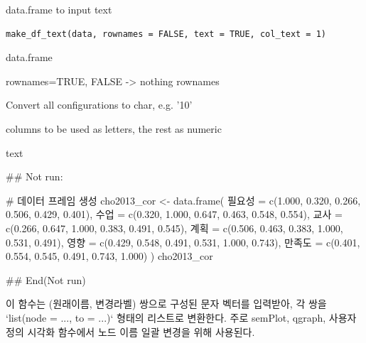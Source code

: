 \documentclass[a4paper]{book}
\begin{document}
%
\begin{Description}
data.frame to input text
\end{Description}
%
\begin{Usage}
\begin{verbatim}
make_df_text(data, rownames = FALSE, text = TRUE, col_text = 1)
\end{verbatim}
\end{Usage}
%
\begin{Arguments}
\begin{ldescription}
\item[\code{data}] data.frame

\item[\code{rownames}] rownames=TRUE, FALSE -> nothing rownames

\item[\code{text}] Convert all configurations to char, e.g. '10'

\item[\code{col\_text}] columns to be used as letters, the rest as numeric
\end{ldescription}
\end{Arguments}
%
\begin{Value}
text
\end{Value}
%
\begin{Examples}
\begin{ExampleCode}

\#\# Not run: 

# 데이터 프레임 생성
cho2013_cor <- data.frame(
  필요성 = c(1.000, 0.320, 0.266, 0.506, 0.429, 0.401),
  수업 = c(0.320, 1.000, 0.647, 0.463, 0.548, 0.554),
  교사 = c(0.266, 0.647, 1.000, 0.383, 0.491, 0.545),
  계획 = c(0.506, 0.463, 0.383, 1.000, 0.531, 0.491),
  영향 = c(0.429, 0.548, 0.491, 0.531, 1.000, 0.743),
  만족도 = c(0.401, 0.554, 0.545, 0.491, 0.743, 1.000)
)
cho2013_cor %



## End(Not run)

\end{ExampleCode}
\end{Examples}
%
\begin{Description}
이 함수는 (원래이름, 변경라벨) 쌍으로 구성된 문자 벡터를 입력받아,
각 쌍을 `list(node = ..., to = ...)` 형태의 리스트로 변환한다.
주로 semPlot, qgraph, 사용자 정의 시각화 함수에서
노드 이름 일괄 변경을 위해 사용된다.
\end{Description}
\end{document}
